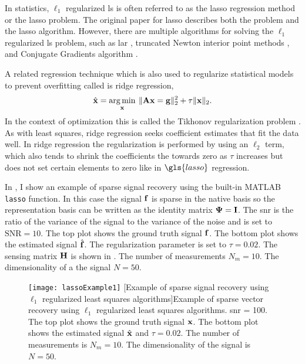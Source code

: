 In statistics, $\ell_1$ regularized \gls{ls} is often referred to as the \gls{lasso} regression method or the \gls{lasso} problem. The original paper for \gls{lasso} describes both the problem and the \gls{lasso} algorithm. However, there are multiple algorithms for solving the $\ell_1$ regularized \gls{ls} problem, such as \gls{lar} \cite{efron2004least}, truncated Newton interior point methods \cite{kim2007interior}, and Conjugate Gradients algorithm \cite{candes2005l1}. 

A related regression technique which is also used to regularize statistical models to prevent overfitting called is \gls{ridge regression},
%
\begin{equation}
	\hat{ \mathbf{x} } = \operatorname*{arg\,min}_{\mathbf{x}} \: \| \mathbf{Ax} = \mathbf{g} \|_{2}^{2} + \tau \| \mathbf{x} \|_2.
	\label{eq:l2regls}
\end{equation}
%
In the context of optimization this is called the Tikhonov regularization problem \cite{kim2007interior, neumaier1998solving}.  As with least squares, \gls{ridge regression} seeks coefficient estimates that fit the data well. In \gls{ridge regression} the regularization is performed by using an $\ell_2$ term, which also tends to shrink the coefficients the towards zero as $\tau$ increases but does not set certain elements to zero like in $\gls{lasso}$ regression. 

In , I show an example of sparse signal recovery using the built-in MATLAB \texttt{lasso} function. In this case the signal $\mathbf{f}$ is sparse in the native basis so the representation basis can be written as the identity matrix $\mathbf{\Psi} = \mathbf{I}$. The \gls{snr} is the ratio of the variance of the signal to the variance of the noise and is set to $\text{SNR} = 10$. The top plot shows the ground truth signal $\mathbf{f}$. The bottom plot shows the estimated signal $\hat{ \mathbf{f} }$. The regularization parameter is set to $\tau = 0.02$. The sensing matrix $\mathbf{H}$ is shown in . The number of measurements $N_m = 10$. The dimensionality of a the signal $N = 50$.

\begin{figure}
	\centering
	\texttt{[image: lassoExample1]}
	[Example of sparse signal recovery using $\ell_1$ regularized least squares algorithms]{Example of sparse vector recovery using $\ell_1$ regularized least squares algorithms. \gls{snr} = 100. The top plot shows the ground truth signal $\mathbf{x}$. The bottom plot shows the estimated signal $\hat{ \mathbf{x} }$ and $\tau = 0.02$. The number of measurements is $N_m = 10$. The dimensionality of the signal is $N = 50$. }
	\label{fig:lassoExample1}
\end{figure}

